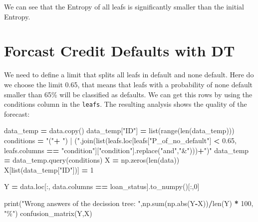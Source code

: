 \documentclass[
]{book}
\newenvironment{Shaded}{\begin{snugshade}}{\end{snugshade}}
\newcommand{\BuiltInTok}[1]{#1}
\newcommand{\DecValTok}[1]{\textcolor[rgb]{0.00,0.00,0.81}{#1}}
\newcommand{\FloatTok}[1]{\textcolor[rgb]{0.00,0.00,0.81}{#1}}
\newcommand{\NormalTok}[1]{#1}
\newcommand{\OperatorTok}[1]{\textcolor[rgb]{0.81,0.36,0.00}{\textbf{#1}}}
\newcommand{\StringTok}[1]{\textcolor[rgb]{0.31,0.60,0.02}{#1}}
\begin{document}
We can see that the Entropy of all leafs is significantly smaller than the initial Entropy.

\hypertarget{forcast-credit-defaults-with-dt}{%
\section{Forcast Credit Defaults with DT}\label{forcast-credit-defaults-with-dt}}

We need to define a limit that splits all leafs in default and none default. Here do we choose the limit 0.65, that means that leafs with a probability of none default smaller than 65\% will be classified as defaults. We can get this rows by using the conditions column in the \texttt{leafs}. The resulting analysis shows the quality of the forecast:

\begin{Shaded}
\begin{Highlighting}[]
\NormalTok{data\_temp }\OperatorTok{=}\NormalTok{ data.copy()}
\NormalTok{data\_temp[}\StringTok{"ID"}\NormalTok{] }\OperatorTok{=} \BuiltInTok{list}\NormalTok{(}\BuiltInTok{range}\NormalTok{(}\BuiltInTok{len}\NormalTok{(data\_temp)))}
\NormalTok{conditions }\OperatorTok{=} \StringTok{"("}\OperatorTok{+} \StringTok{") | ("}\NormalTok{.join(}\BuiltInTok{list}\NormalTok{(leafs.loc[leafs[}\StringTok{"P\_of\_no\_default"}\NormalTok{] }\OperatorTok{\textless{}} \FloatTok{0.65}\NormalTok{, leafs.columns }\OperatorTok{==} \StringTok{"condition"}\NormalTok{][}\StringTok{"condition"}\NormalTok{].replace(}\StringTok{"and"}\NormalTok{,}\StringTok{"\&"}\NormalTok{)))}\OperatorTok{+}\StringTok{")"}
\NormalTok{data\_temp }\OperatorTok{=}\NormalTok{ data\_temp.query(conditions)}
\NormalTok{X }\OperatorTok{=}\NormalTok{ np.zeros(}\BuiltInTok{len}\NormalTok{(data))}
\NormalTok{X[}\BuiltInTok{list}\NormalTok{(data\_temp[}\StringTok{"ID"}\NormalTok{])] }\OperatorTok{=} \DecValTok{1}

\NormalTok{Y }\OperatorTok{=}\NormalTok{ data.loc[:, data.columns }\OperatorTok{==} \StringTok{\textquotesingle{}loan\_status\textquotesingle{}}\NormalTok{].to\_numpy()[:,}\DecValTok{0}\NormalTok{]}

\BuiltInTok{print}\NormalTok{(}\StringTok{"Wrong answers of the decission tree: "}\NormalTok{,np.}\BuiltInTok{sum}\NormalTok{(np.}\BuiltInTok{abs}\NormalTok{(Y}\OperatorTok{{-}}\NormalTok{X))}\OperatorTok{/}\BuiltInTok{len}\NormalTok{(Y) }\OperatorTok{*} \DecValTok{100}\NormalTok{, }\StringTok{"\%"}\NormalTok{)}
\NormalTok{confusion\_matrix(Y,X)}
\end{Highlighting}
\end{Shaded}
\end{document}
